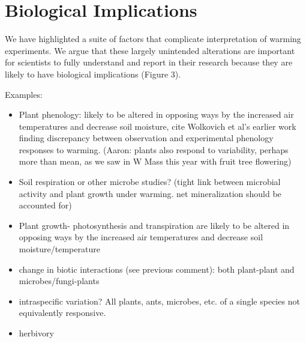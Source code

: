 \documentclass{article}
\begin{document}
\section {Biological Implications}
\par We have highlighted a suite of factors that complicate   interpretation of warming experiments. We argue that these largely unintended alterations are important for scientists to fully understand and report in their research because they are likely to have biological implications (Figure 3).
\par Examples:
\begin{itemize}
\item Plant phenology: likely to be altered in opposing ways by
the increased air temperatures and decrease soil moisture, cite Wolkovich et al's earlier work finding discrepancy between observation and experimental phenology responses to warming. (Aaron: plants also respond to variability, perhaps more than mean, as we saw in W Mass this year with fruit tree flowering)
\item Soil respiration or other microbe studies? (tight link between microbial activity and plant growth under warming. net mineralization should be accounted for)
\item Plant growth- photosynthesis and transpiration are likely to be altered in opposing ways by the increased air temperatures and decrease soil moisture/temperature %
\item change in biotic interactions (see previous comment): both plant-plant and microbes/fungi-plants
\item intraspecific variation? All plants, ants, microbes, etc. of a single species not equivalently responsive. 
\item herbivory
\end{itemize}
\end{document}
